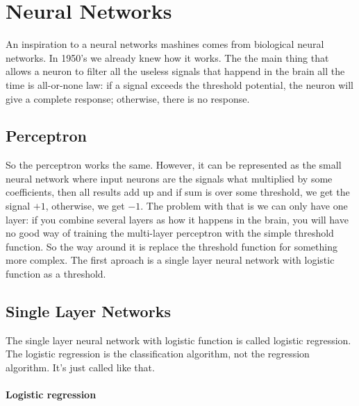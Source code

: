 \chapter{Neural Networks}

{\sf An inspiration to a neural networks mashines comes from biological neural networks. In 1950's we already knew how it works. The the main thing that allows a neuron to filter all the useless signals that happend in the brain all the time is all-or-none law: if a signal exceeds the threshold potential, the neuron will give a complete response; otherwise, there is no response.}

\section{Perceptron}

So the perceptron works the same. However, it can be represented as the small neural network where input neurons are the signals what multiplied by some coefficients, then all results add up and if sum is over some threshold, we get the signal $+1$, otherwise, we get $-1$. The problem with that is we can only have one layer: if you combine several layers as how it happens in the brain, you will have no good way of training the multi-layer perceptron with the simple threshold function. So the way around it is replace the threshold function for something more complex. The first aproach is a single layer neural network with logistic function as a threshold.

\section{Single Layer Networks}

The single layer neural network with logistic function is called logistic regression. The logistic regression is the classification algorithm, not the regression algorithm. It's just called like that.

\subsubsection*{Logistic regression}

